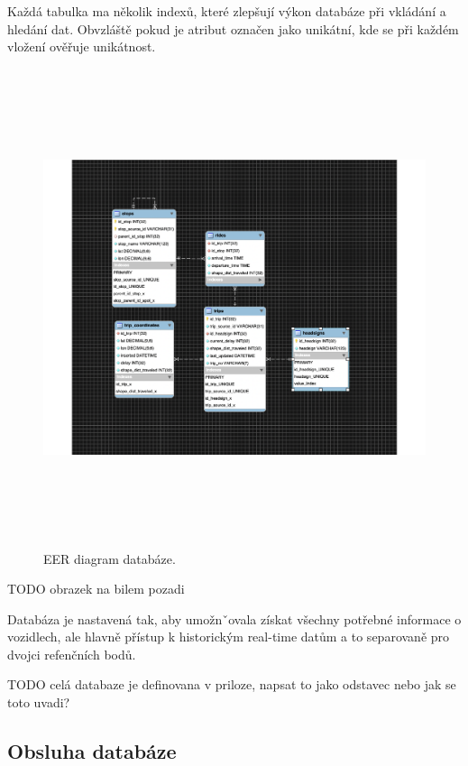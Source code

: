 \bigbreak

Každá tabulka ma několik indexů, které zlepšují výkon databáze při vkládání a hledání dat. Obvzláště pokud je atribut označen jako unikátní, kde se při každém vložení ověřuje unikátnost.

\begin{figure}[p]\centering
\includegraphics[width=140mm, height=140mm]{../img/eer_database}
\caption{EER diagram databáze.}
\label{obr01:EER}

\end{figure}

TODO obrazek na bilem pozadi

Databáza je nastavená tak, aby umožnˇovala získat všechny potřebné informace o vozidlech, ale hlavně přístup k historickým real-time datům a to separovaně pro dvojci refenčních bodů.

TODO celá databaze je definovana v priloze, napsat to jako odstavec nebo jak se toto uvadi?

\subsection{Obsluha databáze}


